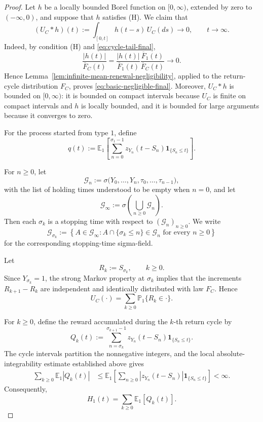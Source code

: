 \documentclass[reqno,final,11pt]{amsart}
\newcommand{\E}{\mathbb E}
\newcommand{\Pbb}{\mathbb P}
\newcommand{\ind}[1]{\mathbf 1_{\{#1\}}}
\theoremstyle{plain}
\theoremstyle{definition}
\theoremstyle{remark}
\numberwithin{equation}{section}
\begin{document}
\begin{proof}
Let \(h\) be a locally bounded Borel function on \([0,\infty)\), extended by zero to \((-\infty,0)\), and suppose that \(h\) satisfies \textup{(H)}. We claim that
\begin{equation}\label{eq:basic-negligible-final}
  (U_C*h)(t):=
  \int_{[0,t]}h(t-s)\,U_C(ds)
  \longrightarrow0,
  \qquad t\to\infty.
\end{equation}
Indeed, by condition \textup{(H)} and \eqref{eq:cycle-tail-final},
\[
  \frac{|h(t)|}{\overline F_C(t)}
  =
  \frac{|h(t)|}{\overline F_1(t)}
  \frac{\overline F_1(t)}{\overline F_C(t)}
  \longrightarrow0.
\]
Hence Lemma~\ref{lem:infinite-mean-renewal-negligibility}, applied to the return-cycle distribution \(F_C\), proves \eqref{eq:basic-negligible-final}. Moreover, \(U_C*h\) is bounded on \([0,\infty)\): it is bounded on compact intervals because \(U_C\) is finite on compact intervals and \(h\) is locally bounded, and it is bounded for large arguments because it converges to zero.

For the process started from type \(1\), define
\begin{equation}\label{eq:cycle-reward-final}
  q(t):=
  \E_1\left[
    \sum_{n=0}^{\sigma_1-1}
    z_{Y_n}(t-S_n)\ind{S_n\le t}
  \right].
\end{equation}



For \(n\ge0\), let
\[
  \mathcal G_n
  :=
  \sigma\bigl(
    Y_0,\ldots,Y_n,
    \tau_0,\ldots,\tau_{n-1}
  \bigr),
\]
with the list of holding times understood to be empty when \(n=0\), and
let
\[
  \mathcal G_\infty
  :=
  \sigma\left(\bigcup_{n\ge0}\mathcal G_n\right).
\]
Then each \(\sigma_k\) is a stopping time with respect to
\((\mathcal G_n)_{n\ge0}\). We write
\[
  \mathcal G_{\sigma_k}
  :=
  \left\{
    A\in\mathcal G_\infty:
    A\cap\{\sigma_k\le n\}\in\mathcal G_n
    \text{ for every }n\ge0
  \right\}
\]
for the corresponding stopping-time sigma-field.

Let
\[
  R_k:=S_{\sigma_k},
  \qquad k\ge0.
\]
Since \(Y_{\sigma_k}=1\), the strong Markov property at \(\sigma_k\)
implies that the increments \(R_{k+1}-R_k\) are independent and
identically distributed with law \(F_C\). Hence
\[
  U_C(\cdot)
  =
  \sum_{k\ge0}\Pbb_1\{R_k\in\cdot\}.
\]

For \(k\ge0\), define the reward accumulated during the \(k\)-th return
cycle by
\[
  Q_k(t)
  :=
  \sum_{n=\sigma_k}^{\sigma_{k+1}-1}
  z_{Y_n}(t-S_n)\ind{S_n\le t}.
\]
The cycle intervals partition the nonnegative integers, and the local
absolute-integrability estimate established above gives
\[
\begin{split}
  \sum_{k\ge0}\E_1|Q_k(t)|
  &\le
  \E_1\left[
    \sum_{n\ge0}
    |z_{Y_n}(t-S_n)|\ind{S_n\le t}
  \right]
  <\infty.
\end{split}
\]
Consequently,
\[
  H_1(t)=\sum_{k\ge0}\E_1[Q_k(t)].
\]


\end{proof}
\end{document}
